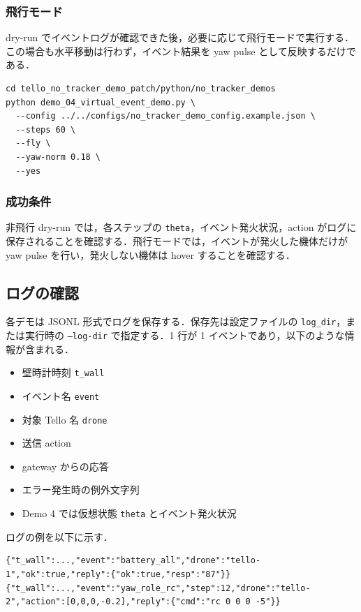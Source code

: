 \subsubsection{飛行モード}

dry-run でイベントログが確認できた後，必要に応じて飛行モードで実行する．この場合も水平移動は行わず，イベント結果を yaw pulse として反映するだけである．

\begin{lstlisting}
cd tello_no_tracker_demo_patch/python/no_tracker_demos
python demo_04_virtual_event_demo.py \
  --config ../../configs/no_tracker_demo_config.example.json \
  --steps 60 \
  --fly \
  --yaw-norm 0.18 \
  --yes
\end{lstlisting}

\subsubsection{成功条件}

非飛行 dry-run では，各ステップの \texttt{theta}，イベント発火状況，action がログに保存されることを確認する．飛行モードでは，イベントが発火した機体だけが yaw pulse を行い，発火しない機体は hover することを確認する．

\subsection{ログの確認}

各デモは JSONL 形式でログを保存する．保存先は設定ファイルの \texttt{log\_dir}，または実行時の \texttt{--log-dir} で指定する．1 行が 1 イベントであり，以下のような情報が含まれる．

\begin{itemize}
  \item 壁時計時刻 \texttt{t\_wall}
  \item イベント名 \texttt{event}
  \item 対象 Tello 名 \texttt{drone}
  \item 送信 action
  \item gateway からの応答
  \item エラー発生時の例外文字列
  \item Demo 4 では仮想状態 \texttt{theta} とイベント発火状況
\end{itemize}

ログの例を以下に示す．

\begin{lstlisting}
{"t_wall":...,"event":"battery_all","drone":"tello-1","ok":true,"reply":{"ok":true,"resp":"87"}}
{"t_wall":...,"event":"yaw_role_rc","step":12,"drone":"tello-2","action":[0,0,0,-0.2],"reply":{"cmd":"rc 0 0 0 -5"}}
\end{lstlisting}



